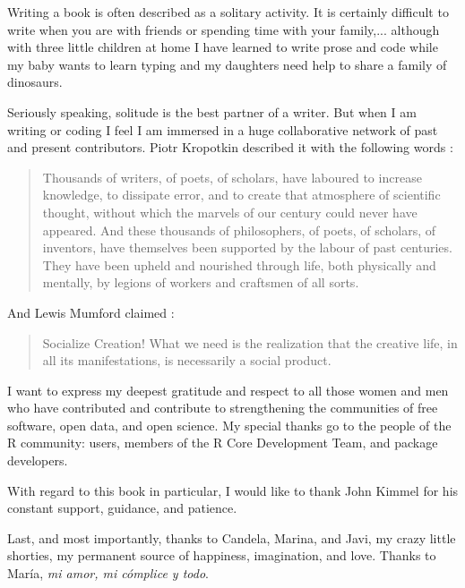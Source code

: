Writing a book is often described as a solitary activity. It is
certainly difficult to write when you are with friends or spending
time with your family,... although with three little children at home
I have learned to write prose and code while my baby wants to learn
typing and my daughters need help to share a family of dinosaurs.

Seriously speaking, solitude is the best partner of a writer. But when
I am writing or coding I feel I am immersed in a huge collaborative
network of past and present contributors. Piotr Kropotkin described it
with the following words \cite{Kropotkin1906}:

\begin{quote}
  Thousands of writers, of poets, of scholars, have laboured to
  increase knowledge, to dissipate error, and to create that
  atmosphere of scientific thought, without which the marvels of our
  century could never have appeared. And these thousands of
  philosophers, of poets, of scholars, of inventors, have themselves
  been supported by the labour of past centuries. They have been
  upheld and nourished through life, both physically and mentally, by
  legions of workers and craftsmen of all sorts.
\end{quote}

And Lewis Mumford claimed \cite{Mumford1934}:

\begin{quote}
  Socialize Creation! What we need is the realization that the
  creative life, in all its manifestations, is necessarily a social
  product.
\end{quote}

I want to express my deepest gratitude and respect to all those women
and men who have contributed and contribute to strengthening the
communities of free software, open data, and open science. My special
thanks go to the people of the \textsf{R} community: users, members
of the \textsf{R} Core Development Team, and package developers.

With regard to this book in particular, I would like to thank John
Kimmel for his constant support, guidance, and patience.

Last, and most importantly, thanks to Candela, Marina, and Javi, my
crazy little shorties, my permanent source of happiness, imagination, and
love. Thanks to María, \emph{mi amor, mi cómplice y todo}.

